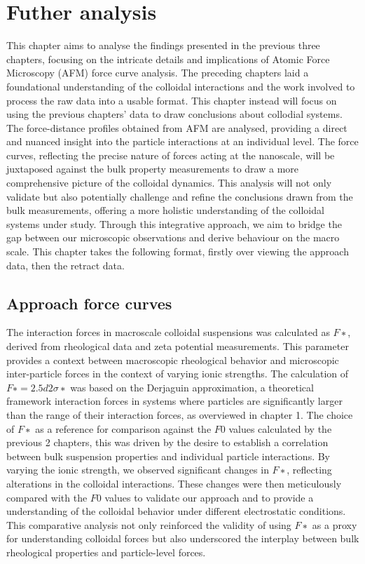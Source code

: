 \chapter{Futher analysis}

This chapter aims to analyse the findings presented in the previous three chapters, focusing on the intricate details and implications of Atomic Force Microscopy (AFM) force curve analysis. The preceding chapters laid a foundational understanding of the colloidal interactions and the work involved to process the raw data into a usable format. This chapter instead will focus on using the previous chapters' data to draw conclusions about collodial systems. The force-distance profiles obtained from AFM are analysed, providing a direct and nuanced insight into the particle interactions at an individual level. The force curves, reflecting the precise nature of forces acting at the nanoscale, will be juxtaposed against the bulk property measurements to draw a more comprehensive picture of the colloidal dynamics. This analysis will not only validate but also potentially challenge and refine the conclusions drawn from the bulk measurements, offering a more holistic understanding of the colloidal systems under study. Through this integrative approach, we aim to bridge the gap between our microscopic observations and derive behaviour on the macro scale. This chapter takes the following format, firstly over viewing the approach data, then the retract data.

\section{Approach force curves}



The interaction forces in macroscale colloidal suspensions was calculated as $F∗$, derived from rheological data and zeta potential measurements. This parameter provides a context between macroscopic rheological behavior and microscopic inter-particle forces in the context of varying ionic strengths. The calculation of $F∗=2.5d2σ∗$ was based on the Derjaguin approximation, a theoretical framework interaction forces in systems where particles are significantly larger than the range of their interaction forces, as overviewed in chapter 1. The choice of $F∗$ as a reference for comparison against the $F0$ values calculated by the previous 2 chapters, this was driven by the desire to establish a correlation between bulk suspension properties and individual particle interactions. By varying the ionic strength, we observed significant changes in $F∗$, reflecting alterations in the colloidal interactions. These changes were then meticulously compared with the $F0$ values to validate our approach and to provide a understanding of the colloidal behavior under different electrostatic conditions. This comparative analysis not only reinforced the validity of using $F∗$ as a proxy for understanding colloidal forces but also underscored the interplay between bulk rheological properties and particle-level forces.


